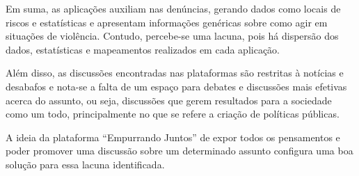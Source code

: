 Em suma, as aplicações auxiliam nas denúncias, gerando dados como locais de riscos e estatísticas e
apresentam informações genéricas sobre como agir em situações de violência. 
Contudo, percebe-se uma lacuna, pois há dispersão dos dados, estatísticas e mapeamentos realizados em cada aplicação.

Além disso, as discussões encontradas nas plataformas são restritas à notícias e desabafos e nota-se a falta de um espaço
para debates e discussões mais efetivas acerca do assunto, ou seja, discussões que gerem resultados para a sociedade
como um todo, principalmente no que se refere a criação de políticas públicas.

A ideia da plataforma ``Empurrando Juntos'' de expor todos os pensamentos e poder promover uma discussão sobre um determinado
assunto configura uma boa solução para essa lacuna identificada.

